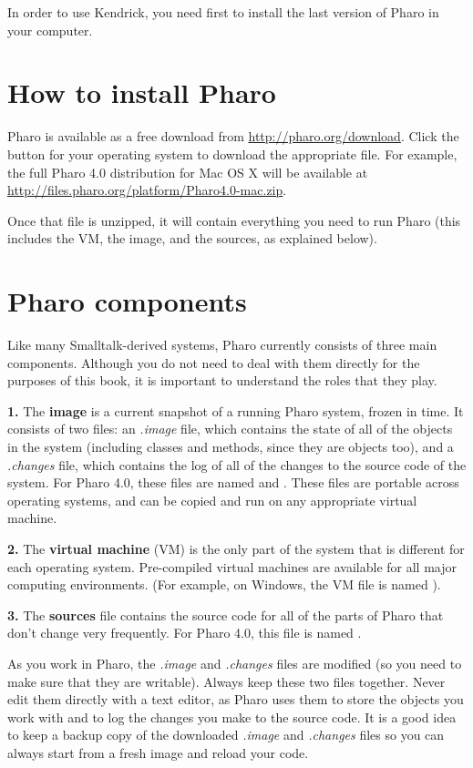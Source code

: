 \documentclass[a4paper,10pt,twoside]{book}
\begin{document}
In order to use Kendrick, you need first to install the last version of Pharo in your computer.
\section{How to install Pharo}
Pharo is available as a free download from
\url{http://pharo.org/download}. Click the button for your
operating system to download the appropriate  file. For example, the
full Pharo 4.0 distribution for Mac OS X will be available at
\url{http://files.pharo.org/platform/Pharo4.0-mac.zip}.

Once that file is unzipped, it will contain everything you need to run
Pharo (this includes the VM, the image, and the sources, as explained below).
\section{Pharo components}
Like many Smalltalk-derived systems, Pharo currently consists of three main
components. Although you do not need to deal with them directly for the purposes
of this book, it is important to understand the roles that they play.

\textbf{1.} The \textbf{image} is a current snapshot of a running Pharo system, frozen in
time. It consists of two files: an \textit{.image} file, which contains the state of
all of the objects in the system (including classes and methods, since they are
objects too), and a \textit{.changes} file, which contains the log of all of the
changes to the source code of the system. For Pharo 4.0, these files are named
 and . These files are portable across
operating systems, and can be copied and run on any appropriate virtual machine.

\textbf{2.} The \textbf{virtual machine} (VM) is the only part of the system that is
different for each operating system. Pre-compiled virtual machines are available
for all major computing environments. (For example, on Windows, the VM file is
named ).

\textbf{3.} The \textbf{sources} file contains the source code for all of the parts of
Pharo that don't change very frequently. For Pharo 4.0, this file is named
.

As you work in Pharo, the \textit{.image} and \textit{.changes} files are modified (so you
need to make sure that they are writable). Always keep these two files together.
Never edit them directly with a text editor, as Pharo uses them to store the
objects you work with and to log the changes you make to the source code. It is
a good idea to keep a backup copy of the downloaded \textit{.image} and \textit{.changes}
files so you can always start from a fresh image and reload your code.
\end{document}
